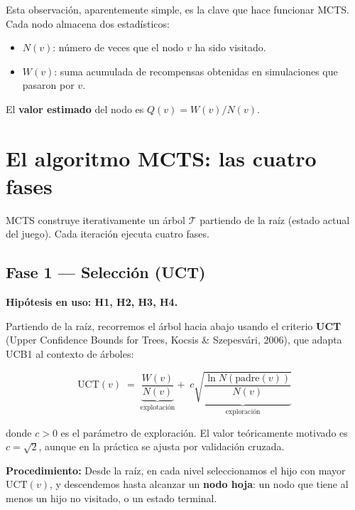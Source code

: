 \documentclass[12pt, a4paper]{article}
\begin{document}
Esta observación, aparentemente simple, es la clave que hace funcionar MCTS.
Cada nodo almacena dos estadísticos:

\begin{itemize}
  \item $N(v)$: número de veces que el nodo $v$ ha sido visitado.
  \item $W(v)$: suma acumulada de recompensas obtenidas en simulaciones que
    pasaron por $v$.
\end{itemize}

El \textbf{valor estimado} del nodo es $Q(v) = W(v)/N(v)$.

\section{El algoritmo MCTS: las cuatro fases}

MCTS construye iterativamente un árbol $\mathcal{T}$ partiendo de la raíz
(estado actual del juego). Cada iteración ejecuta cuatro fases.

\subsection{Fase 1 — Selección (UCT)}

\textbf{Hipótesis en uso: H1, H2, H3, H4.}

Partiendo de la raíz, recorremos el árbol hacia abajo usando el criterio
\textbf{UCT} (Upper Confidence Bounds for Trees, Kocsis \& Szepesvári, 2006),
que adapta UCB1 al contexto de árboles:

\begin{equation}
  \text{UCT}(v) \;=\;
  \underbrace{\dfrac{W(v)}{N(v)}}_{\text{explotación}}
  +\;
  c\underbrace{\sqrt{\dfrac{\ln N(\mathrm{padre}(v))}{N(v)}}}_{\text{exploración}}
  \label{eq:uct}
\end{equation}

donde $c > 0$ es el parámetro de exploración. El valor teóricamente motivado
es $c = \sqrt{2}$, aunque en la práctica se ajusta por validación cruzada.

\textbf{Procedimiento:} Desde la raíz, en cada nivel seleccionamos el hijo
con mayor $\text{UCT}(v)$, y descendemos hasta alcanzar un \textbf{nodo hoja}:
un nodo que tiene al menos un hijo no visitado, o un estado terminal.
\end{document}
